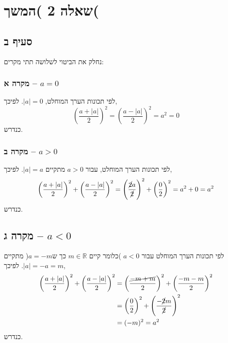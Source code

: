 \documentclass[11pt, oneside]{article}
\newcommand{\qed}{\R{$\blacksquare$}}
\newcommand{\br}{\\\\\\\\\\\\\\}
\newcommand{\mR}{\mathbb{R}}
\begin{document}
\setcounter{section}{1}
\section{שאלה 2 )המשך(}
\setcounter{subsection}{1}
\subsection{סעיף ב}
נחלק את הביטוי לשלושה תתי מקרים:
\subsubsection{מקרה א -- $a = 0$}
לפי תכונות הערך המוחלט, $|a| = 0$. לפיכך,
\[
\left(\frac{a + |a|}{2}\right)^2 = \left(\frac{a - |a|}{2}\right)^2 = a^2 = 0
\]
כנדרש.
\subsubsection{מקרה ב -- $a > 0$}
לפי תכונות הערך המוחלט, עבור $a > 0$ מתקיים $|a| = a$. לפיכך,
\[
\left(\frac{a + |a|}{2}\right)^2 + \left(\frac{a - |a|}{2}\right)^2
= \left(\frac{\cancel{2}a}{\cancel{2}}\right)^2 + \left(\frac{0}{2}\right)^2
= a^2 + 0
= a^2
\]
כנדרש.
\subsection{מקרה ג -- $a < 0$}
לפי תכונות הערך המוחלט עבור $a < 0$ )כלומר קיים $m \in \mR$ כך ש$a = -m$( מתקיים $|a| = -a = m$. לפיכך,
\begin{align*}
\left(\frac{a + |a|}{2}\right)^2 + \left(\frac{a - |a|}{2}\right)^2
&= \left(\frac{\cancel{-m + m}}{2}\right)^2 + \left(\frac{-m - m}{2}\right)^2\\
&= \left(\frac{0}{2}\right)^2 + \left(\frac{-\cancel{2}m}{\cancel{2}}\right)^2\\
&= (-m)^2 = a^2\\
\end{align*}
כנדרש.
\br\qed
\end{document}
